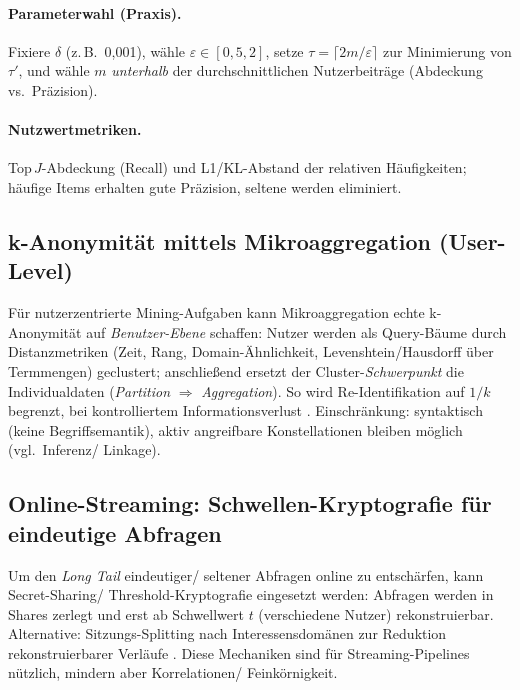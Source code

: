 \paragraph{Parameterwahl (Praxis).} Fixiere $\delta$ (z.\,B.\ 0{,}001), wähle $\varepsilon\in[0{,}5,2]$, setze $\tau=\lceil 2m/\varepsilon\rceil$ zur Minimierung von $\tau'$, und wähle $m$ \emph{unterhalb} der durchschnittlichen Nutzerbeiträge (Abdeckung vs.\ Präzision). 
\paragraph{Nutzwertmetriken.} Top\,$J$-Abdeckung (Recall) und L1/KL-Abstand der relativen Häufigkeiten; häufige Items erhalten gute Präzision, seltene werden eliminiert.

\subsection{k-Anonymität mittels Mikroaggregation (User-Level)}
Für nutzerzentrierte Mining-Aufgaben kann Mikroaggregation echte k-Anonymität auf \emph{Benutzer-Ebene} schaffen: Nutzer werden als Query-Bäume durch Distanzmetriken (Zeit, Rang, Domain-Ähnlichkeit, Levenshtein/Hausdorff über Termmengen) geclustert; anschließend ersetzt der Cluster-\emph{Schwerpunkt} die Individualdaten (\emph{Partition} $\Rightarrow$ \emph{Aggregation}). So wird Re-Identifikation auf $1/k$ begrenzt, bei kontrolliertem Informationsverlust \cite{NavarroUserKAnon}. Einschränkung: syntaktisch (keine Begriffsemantik), aktiv angreifbare Konstellationen bleiben möglich (vgl.\ Inferenz/ Linkage).

\subsection{Online-Streaming: Schwellen-Kryptografie für eindeutige Abfragen}
Um den \emph{Long Tail} eindeutiger/ seltener Abfragen online zu entschärfen, kann Secret-Sharing/ Threshold-Kryptografie eingesetzt werden: Abfragen werden in Shares zerlegt und erst ab Schwellwert $t$ (verschiedene Nutzer) rekonstruierbar. Alternative: Sitzungs-Splitting nach Interessensdomänen zur Reduktion rekonstruierbarer Verläufe \cite{AdarQueryLogs}. Diese Mechaniken sind für Streaming-Pipelines nützlich, mindern aber Korrelationen/ Feinkörnigkeit.

